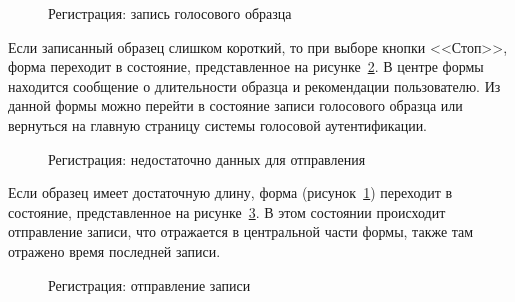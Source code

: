 \begin{figure}[hbt!]
\caption{Регистрация: запись голосового образца}
\label{fig:enrollment_recording}
\end{figure}

Если записанный образец слишком короткий, то при выборе кнопки <<Стоп>>, форма переходит в состояние, представленное на рисунке~\ref{fig:enrollment_too_short_to_upload}. В центре формы находится сообщение о длительности образца и рекомендации пользователю. Из данной формы можно перейти в состояние записи голосового образца или вернуться на главную страницу системы голосовой аутентификации.


\begin{figure}[hbt!]
\caption{Регистрация: недостаточно данных для отправления}
\label{fig:enrollment_too_short_to_upload}
\end{figure}

Если образец имеет достаточную длину, форма
(рисунок~\ref{fig:enrollment_recording}) переходит в состояние, представленное
на рисунке~\ref{fig:enrollment_uploading}. В этом состоянии происходит
отправление записи, что отражается в  центральной части формы, также там
отражено время последней записи.


\begin{figure}[hbt!]
\caption{Регистрация: отправление записи}
\label{fig:enrollment_uploading}
\end{figure}


